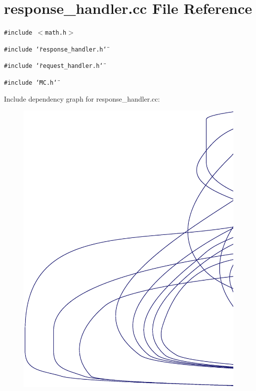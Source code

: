 \section{response\_\-handler.cc File Reference}
\label{response__handler_8cc}
{\tt \#include $<$math.h$>$}\par
{\tt \#include \char`\"{}response\_\-handler.h\char`\"{}}\par
{\tt \#include \char`\"{}request\_\-handler.h\char`\"{}}\par
{\tt \#include \char`\"{}MC.h\char`\"{}}\par


Include dependency graph for response\_\-handler.cc:\nopagebreak
\begin{figure}[H]
\begin{center}
\leavevmode
\includegraphics[width=420pt]{response__handler_8cc__incl}
\end{center}
\end{figure}
